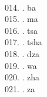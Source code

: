 \begin{tabbing}
\egroup  \\
014.	. 	\> ba 	\> \bgroup\tibetan \def\u#1{\vtop{\baselineskip0pt\hbox{#1}\hbox{\tibsp\char123}}}\parindent=0pt \newbox\fillerbox\setbox\fillerbox\hbox{\vrule height0.4cm depth0.4cm width0pt}\def\filler{\copy\fillerbox}\filler\tibsp{}\tenrm\ \tibetan
\egroup  \\
015.	. 	\> ma 	\> \bgroup\tibetan \def\u#1{\vtop{\baselineskip0pt\hbox{#1}\hbox{\tibsp\char123}}}\parindent=0pt \newbox\fillerbox\setbox\fillerbox\hbox{\vrule height0.4cm depth0.4cm width0pt}\def\filler{\copy\fillerbox}\filler\tibsp{}\tenrm\ \tibetan
\egroup  \\
016.	. 	\> tsa 	\> \bgroup\tibetan \def\u#1{\vtop{\baselineskip0pt\hbox{#1}\hbox{\tibsp\char123}}}\parindent=0pt \newbox\fillerbox\setbox\fillerbox\hbox{\vrule height0.4cm depth0.4cm width0pt}\def\filler{\copy\fillerbox}\filler\tibsp{}\tenrm\ \tibetan
\egroup  \\
017.	. 	\> tsha 	\> \bgroup\tibetan \def\u#1{\vtop{\baselineskip0pt\hbox{#1}\hbox{\tibsp\char123}}}\parindent=0pt \newbox\fillerbox\setbox\fillerbox\hbox{\vrule height0.4cm depth0.4cm width0pt}\def\filler{\copy\fillerbox}\filler\tibsp{}\tenrm\ \tibetan
\egroup  \\
018.	. 	\> dza 	\> \bgroup\tibetan \def\u#1{\vtop{\baselineskip0pt\hbox{#1}\hbox{\tibsp\char123}}}\parindent=0pt \newbox\fillerbox\setbox\fillerbox\hbox{\vrule height0.4cm depth0.4cm width0pt}\def\filler{\copy\fillerbox}\filler\tibsp{}\tenrm\ \tibetan
\egroup  \\
019.	. 	\> wa 	\> \bgroup\tibetan \def\u#1{\vtop{\baselineskip0pt\hbox{#1}\hbox{\tibsp\char123}}}\parindent=0pt \newbox\fillerbox\setbox\fillerbox\hbox{\vrule height0.4cm depth0.4cm width0pt}\def\filler{\copy\fillerbox}\filler\tibsp{}\tenrm\ \tibetan
\egroup  \\
020.	. 	\> zha 	\> \bgroup\tibetan \def\u#1{\vtop{\baselineskip0pt\hbox{#1}\hbox{\tibsp\char123}}}\parindent=0pt \newbox\fillerbox\setbox\fillerbox\hbox{\vrule height0.4cm depth0.4cm width0pt}\def\filler{\copy\fillerbox}\filler\tibsp{}\tenrm\ \tibetan
\egroup  \\
021.	. 	\> za 	\> \bgroup\tibetan \def\u#1{\vtop{\baselineskip0pt\hbox{#1}\hbox{\tibsp\char123}}}\parindent=0pt \newbox\fillerbox\setbox\fillerbox\hbox{\vrule height0.4cm depth0.4cm width0pt}\def\filler{\copy\fillerbox}\filler\tibsp{}\tenrm\ \tibetan

\end{tabbing}
